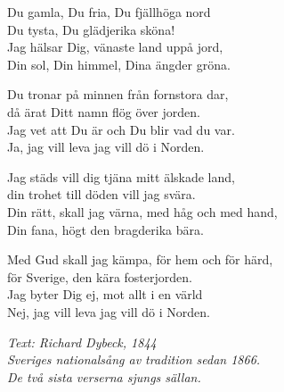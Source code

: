 \vspace{10pt}
Du gamla, Du fria, Du fjällhöga nord\\
Du tysta, Du glädjerika sköna!\\
Jag hälsar Dig, vänaste land uppå jord,\\
\revrpt Din sol, Din himmel, Dina ängder gröna.\rpt\par
\vspace{10pt}
Du tronar på minnen från fornstora dar,\\
då ärat Ditt namn flög över jorden.\\
Jag vet att Du är och Du blir vad du var.\\
\revrpt Ja, jag vill leva jag vill dö i Norden.\rpt\par
\vspace{10pt}
Jag städs vill dig tjäna mitt älskade land,\\
din trohet till döden vill jag svära.\\
Din rätt, skall jag värna, med håg och med hand,\\
\revrpt Din fana, högt den bragderika bära.\rpt\par
\vspace{10pt}
Med Gud skall jag kämpa, för hem och för härd,\\
för Sverige, den kära fosterjorden.\\
Jag byter Dig ej, mot allt i en värld\\
\revrpt Nej, jag vill leva jag vill dö i Norden.\rpt\par
\vspace{10pt}
{\footnotesize\textit{Text: Richard Dybeck, 1844\\
Sveriges nationalsång av tradition sedan 1866.\\
De två sista verserna sjungs sällan.}}
